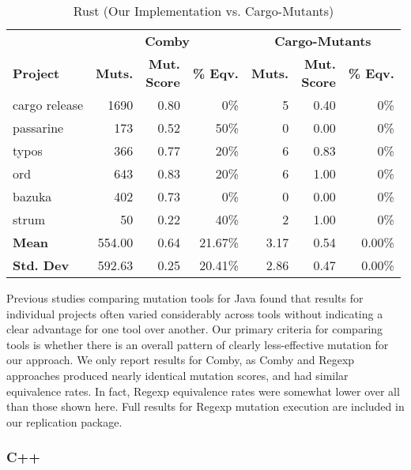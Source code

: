 \documentclass[sigconf,review, anonymous]{acmart}
\begin{document}
{\begin{table}[htbp]
\centering
{\small
\caption{Rust (Our Implementation vs. Cargo-Mutants)}
\label{tab:table_rust2}
\begin{tabularx}{\columnwidth}{X|rrr|rrr}
\toprule
        & \multicolumn{3}{c|}{\textbf{Comby}}  & \multicolumn{3}{c}{\textbf{Cargo-Mutants}} \\ 
\textbf{Project} & \textbf{Muts.} & \makecell{\textbf{Mut.} \\ \textbf{Score}} & \textbf{\% Eqv.} & \textbf{Muts.} & \makecell{\textbf{Mut.} \\ \textbf{Score}} & \textbf{\% Eqv.} \\\midrule
cargo release & 1690 & 0.80 & 0\% & 5 & 0.40 & 0\%   \\
passarine & 173 & 0.52 & 50\% & 0 & 0.00 & 0\%   \\
typos & 366 & 0.77 & 20\% & 6 & 0.83 & 0\%   \\
ord & 643 & 0.83 & 20\% & 6 & 1.00 & 0\%   \\
bazuka & 402 & 0.73 & 0\% & 0 & 0.00 & 0\%   \\
strum & 50 & 0.22 & 40\% & 2 & 1.00 & 0\%   \\\midrule
\textbf{Mean}   & 554.00 & 0.64 & 21.67\% & 3.17 & 0.54 & 0.00\%\\
\textbf{Std. Dev} & 592.63 & 0.25 & 20.41\%   & 2.86 & 0.47 & 0.00\% \\\bottomrule
\end{tabularx}
}
\end{table}

Previous studies comparing mutation tools for Java
\cite{MajorPIT,gopinath2017does,CommACMJavaTool} found that results
for individual projects often varied considerably across tools without
indicating a clear advantage for one tool over another.  Our primary
criteria for comparing tools is whether there is an overall pattern of
clearly less-effective mutation for our approach.  We only report
results for Comby, as Comby and Regexp approaches produced nearly
identical mutation scores, and had similar equivalence rates.  In
fact, Regexp equivalence rates were somewhat lower over all than those
shown here.  Full results for Regexp mutation execution are included
in our replication package.

\subsubsection{C++}

}
\end{document}
